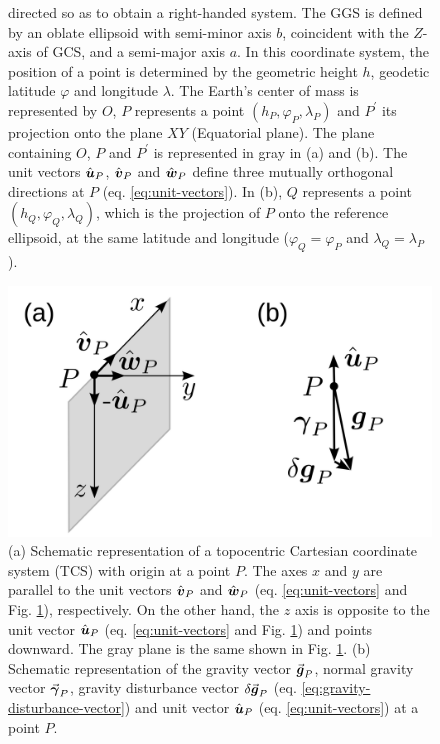 \documentclass[extra]{gji}
\newcommand{\versor}[1]{\hat{\mitbf{#1}}}
\renewcommand{\vector}[1]{\vec{\mitbf{#1}}}
\begin{document}
\begin{figure}
{    directed so as to obtain a right-handed system. The GGS is      defined by an oblate ellipsoid with semi-minor axis $b$,
    coincident with the $Z$-axis of GCS, and a semi-major
    axis $a$. In this coordinate system, the position of a point is
    determined by the geometric height $h$, geodetic latitude
    $\varphi$ and longitude $\lambda$.
    The Earth's center of mass is represented
    by $O$, $P$ represents a point $(h_{P}, \varphi_{P}, \lambda_{P})$ and $P^{\prime}$ its projection onto the plane $XY$
    (Equatorial plane). The plane containing $O$, $P$ and
    $P^{\prime}$ is represented in gray in (a) and (b).
    The unit vectors $\versor{u}_{P}$, $\versor{v}_{P}$ and
    $\versor{w}_{P}$ define three mutually orthogonal
    directions at $P$ (eq. \ref{eq:unit-vectors}).
    In (b), $Q$ represents a point $(h_{Q}, \varphi_{Q}, \lambda_{Q})$,
    which is the projection of $P$ onto the reference ellipsoid, at
    the same latitude and longitude ($\varphi_{Q} = \varphi_{P}$ and $\lambda_{Q} = \lambda_{P}$).}
  \label{fig:GCS-GGS}
\end{figure}

\begin{figure}
    \includegraphics{figures/local-system.png}
    \caption{(a) Schematic representation of a topocentric Cartesian
    coordinate system (TCS) with origin at a point $P$. The axes $x$
    and $y$ are parallel to the unit vectors $\versor{v}_{P}$
    and $\versor{w}_{P}$ (eq. \ref{eq:unit-vectors} and
    Fig. \ref{fig:GCS-GGS}), respectively. On the other hand, the $z$ axis is opposite to the unit vector $\versor{u}_{P}$ (eq.
    \ref{eq:unit-vectors} and Fig. \ref{fig:GCS-GGS}) and points downward. The gray plane is the same shown in Fig. \ref{fig:GCS-GGS}.
    (b) Schematic representation of the gravity vector
    $\vector{g}_{P}$, normal gravity vector $\vector{\gamma}_{P}$,
    gravity disturbance vector $\delta \vector{g}_{P}$
    (eq. \ref{eq:gravity-disturbance-vector}) and unit vector
    $\versor{u}_{P}$ (eq. \ref{eq:unit-vectors}) at a point
    $P$.}
  \label{fig:TCS}
\end{figure}
\end{document}
